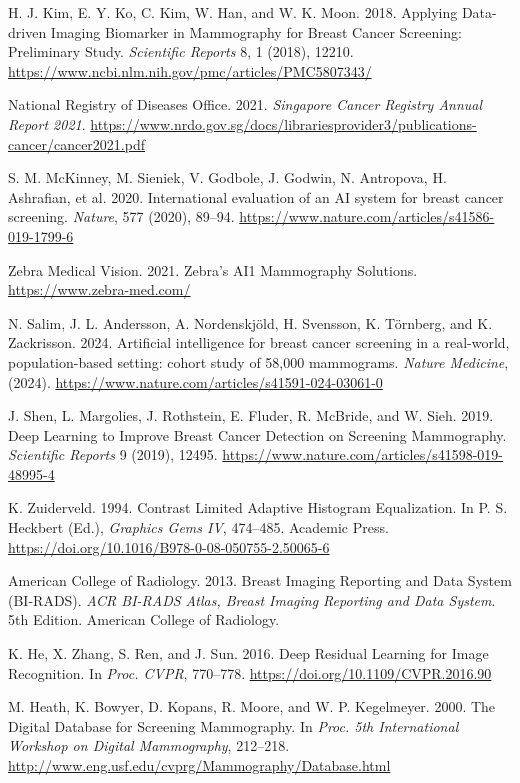 \documentclass[12pt]{article}
\begin{document}
\begin{thebibliography}{99}
    H. J. Kim, E. Y. Ko, C. Kim, W. Han, and W. K. Moon. 2018. Applying Data-driven Imaging Biomarker in Mammography for Breast Cancer Screening: Preliminary Study. \textit{Scientific Reports} 8, 1 (2018), 12210. \url{https://www.ncbi.nlm.nih.gov/pmc/articles/PMC5807343/}
    
    National Registry of Diseases Office. 2021. \textit{Singapore Cancer Registry Annual Report 2021}. \url{https://www.nrdo.gov.sg/docs/librariesprovider3/publications-cancer/cancer2021.pdf}

    S. M. McKinney, M. Sieniek, V. Godbole, J. Godwin, N. Antropova, H. Ashrafian, et al. 2020. International evaluation of an AI system for breast cancer screening. \textit{Nature}, 577 (2020), 89–94. \url{https://www.nature.com/articles/s41586-019-1799-6}

    Zebra Medical Vision. 2021. Zebra’s AI1 Mammography Solutions. \url{https://www.zebra-med.com/}

    N. Salim, J. L. Andersson, A. Nordenskjöld, H. Svensson, K. Törnberg, and K. Zackrisson. 2024. Artificial intelligence for breast cancer screening in a real-world, population-based setting: cohort study of 58,000 mammograms. \textit{Nature Medicine}, (2024). \url{https://www.nature.com/articles/s41591-024-03061-0}

    J. Shen, L. Margolies, J. Rothstein, E. Fluder, R. McBride, and W. Sieh. 2019. Deep Learning to Improve Breast Cancer Detection on Screening Mammography. \textit{Scientific Reports} 9 (2019), 12495. \url{https://www.nature.com/articles/s41598-019-48995-4}

    K. Zuiderveld. 1994. Contrast Limited Adaptive Histogram Equalization. In P. S. Heckbert (Ed.), \textit{Graphics Gems IV}, 474–485. Academic Press. \url{https://doi.org/10.1016/B978-0-08-050755-2.50065-6}

    American College of Radiology. 2013. Breast Imaging Reporting and Data System (BI-RADS). \textit{ACR BI-RADS Atlas, Breast Imaging Reporting and Data System}. 5th Edition. American College of Radiology.

    K. He, X. Zhang, S. Ren, and J. Sun. 2016. Deep Residual Learning for Image Recognition. In \textit{Proc. CVPR}, 770–778. \url{https://doi.org/10.1109/CVPR.2016.90}

    M. Heath, K. Bowyer, D. Kopans, R. Moore, and W. P. Kegelmeyer. 2000. The Digital Database for Screening Mammography. In \textit{Proc. 5th International Workshop on Digital Mammography}, 212–218. \url{http://www.eng.usf.edu/cvprg/Mammography/Database.html}


\end{thebibliography}
\end{document}
